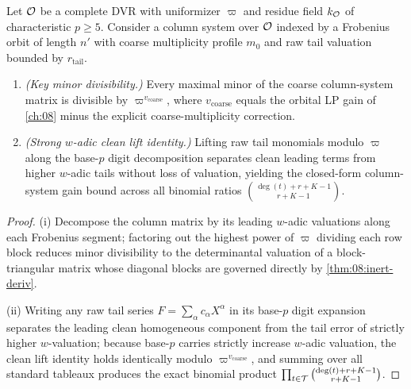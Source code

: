 \begin{proposition}
\label{prop:09:coarse-clean}
Let $\mathcal{O}$ be a complete DVR with uniformizer $\varpi$ and residue field $k_{\mathcal{O}}$ of characteristic $p \ge 5$. Consider a column system over $\mathcal{O}$ indexed by a Frobenius orbit of length $n'$ with coarse multiplicity profile $m_0$ and raw tail valuation bounded by $r_{\mathrm{tail}}$.
\begin{enumerate}[label=\textup{(\roman*)}]
\item \emph{(Key minor divisibility.)} Every maximal minor of the coarse column-system matrix is divisible by $\varpi^{v_{\mathrm{coarse}}}$, where $v_{\mathrm{coarse}}$ equals the orbital LP gain of \cref{ch:08} minus the explicit coarse-multiplicity correction.
\item \emph{(Strong $w$-adic clean lift identity.)} Lifting raw tail monomials modulo $\varpi$ along the base-$p$ digit decomposition separates clean leading terms from higher $w$-adic tails without loss of valuation, yielding the closed-form column-system gain bound across all binomial ratios $\binom{\deg(t) + r + K - 1}{r + K - 1}$.
\end{enumerate}
\end{proposition}

\begin{proof}
(i) Decompose the column matrix by its leading $w$-adic valuations along each Frobenius segment; factoring out the highest power of $\varpi$ dividing each row block reduces minor divisibility to the determinantal valuation of a block-triangular matrix whose diagonal blocks are governed directly by \cref{thm:08:inert-deriv}.

(ii) Writing any raw tail series $F = \sum_{\alpha} c_\alpha X^\alpha$ in its base-$p$ digit expansion separates the leading clean homogeneous component from the tail error of strictly higher $w$-valuation; because base-$p$ carries strictly increase $w$-adic valuation, the clean lift identity holds identically modulo $\varpi^{v_{\mathrm{coarse}}}$, and summing over all standard tableaux produces the exact binomial product $\prod_{t \in \mathcal{T}}\binom{\deg(t) + r + K - 1}{r + K - 1}$.
\end{proof}

